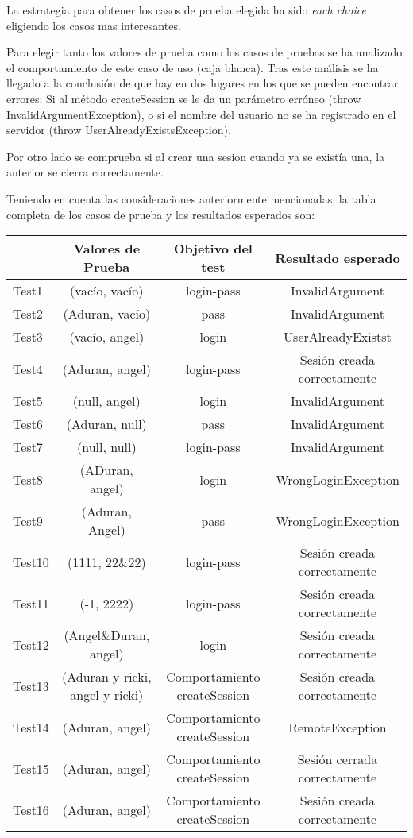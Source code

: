 La estrategia para obtener los casos de prueba elegida ha sido
\textit{each choice} eligiendo los casos mas interesantes.

Para elegir tanto los valores de prueba como los casos de pruebas se ha analizado el comportamiento de este caso de uso (caja blanca). Tras este análisis se ha llegado a la conclusión de que hay en dos lugares en los que se pueden encontrar errores: Si al método createSession se le da un parámetro erróneo (throw InvalidArgumentException), o si el nombre del usuario no se ha registrado en el servidor (throw UserAlreadyExistsException).

Por otro lado se comprueba si al crear una sesion cuando ya se existía una, la anterior se cierra correctamente.


Teniendo en cuenta las consideraciones anteriormente mencionadas, la tabla completa de los casos de prueba y los resultados esperados son:

{\footnotesize
\begin{longtable}[c]{lccc}
 & \textbf{Valores de Prueba} & \textbf{Objetivo del test} & \textbf{Resultado esperado} \\
\hline \hline
\endhead

Test1 & (vacío, vacío)  & login-pass & InvalidArgument\\
Test2 & (Aduran, vacío) & pass & InvalidArgument\\
Test3 & (vacío, angel) & login & UserAlreadyExistst\\
Test4 & (Aduran, angel) & login-pass   & Sesión creada correctamente\\
Test5 & (null, angel) & login   & InvalidArgument\\
Test6 & (Aduran, null) & pass   & InvalidArgument\\
Test7 & (null, null) & login-pass   & InvalidArgument\\
Test8 & (ADuran, angel) & login & WrongLoginException\\
Test9 & (Aduran, Angel) & pass & WrongLoginException\\
Test10 & (1111, 22\&22) & login-pass & Sesión creada correctamente\\
Test11& (-1, 2222) & login-pass  & Sesión creada correctamente\\
Test12& (Angel\&Duran, angel) & login  &  Sesión creada correctamente \\
Test13 & (Aduran y ricki, angel y ricki) & Comportamiento createSession & Sesión creada correctamente\\
Test14 & (Aduran, angel) & Comportamiento createSession & RemoteException\\
Test15 & (Aduran, angel) & Comportamiento createSession & Sesión cerrada correctamente\\
Test16 & (Aduran, angel) & Comportamiento createSession & Sesión creada correctamente\\

\hline
\end{longtable}
}
